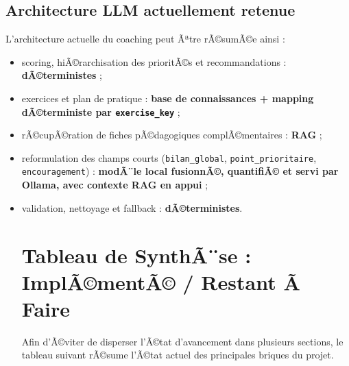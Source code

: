 ﻿\documentclass[12pt,a4paper]{article}
\begin{document}
\subsection{Architecture LLM actuellement retenue}
L'architecture actuelle du coaching peut Ãªtre rÃ©sumÃ©e ainsi :
\begin{itemize}
    \item scoring, hiÃ©rarchisation des prioritÃ©s et recommandations : \textbf{dÃ©terministes} ;
    \item exercices et plan de pratique : \textbf{base de connaissances + mapping dÃ©terministe par \texttt{exercise\_key}} ;
    \item rÃ©cupÃ©ration de fiches pÃ©dagogiques complÃ©mentaires : \textbf{RAG} ;
    \item reformulation des champs courts (\texttt{bilan\_global}, \texttt{point\_prioritaire}, \texttt{encouragement}) : \textbf{modÃ¨le local fusionnÃ©, quantifiÃ© et servi par Ollama, avec contexte RAG en appui} ;
    \item validation, nettoyage et fallback : \textbf{dÃ©terministes}.

\section{Tableau de SynthÃ¨se : ImplÃ©mentÃ© / Restant Ã  Faire}
Afin d'Ã©viter de disperser l'Ã©tat d'avancement dans plusieurs sections, le tableau suivant rÃ©sume l'Ã©tat actuel des principales briques du projet.


\end{itemize}
\end{document}
